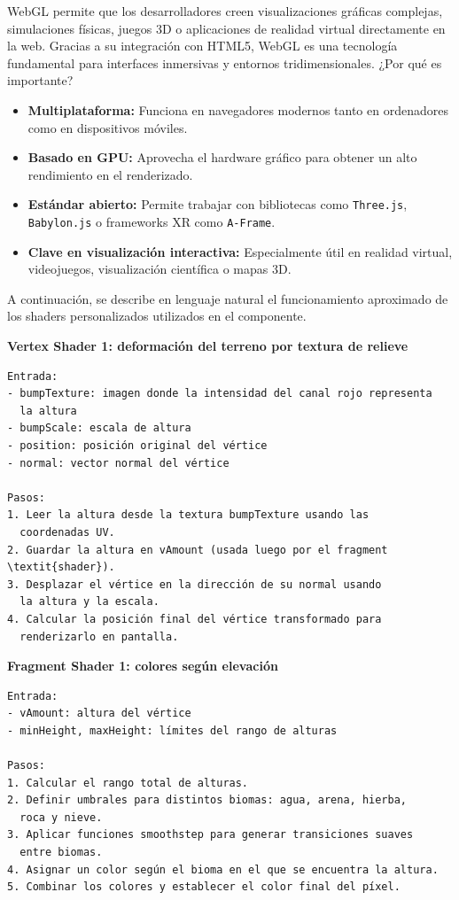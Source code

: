 \documentclass[a4paper, 12pt]{book}
\begin{document}
WebGL permite que los desarrolladores creen visualizaciones gráficas complejas, simulaciones físicas, juegos 3D o aplicaciones de realidad virtual directamente en la web. Gracias a su integración con HTML5, WebGL es una tecnología fundamental para interfaces inmersivas y entornos tridimensionales. ¿Por qué es importante?

\begin{itemize}
    \item \textbf{Multiplataforma:} Funciona en navegadores modernos tanto en ordenadores como en dispositivos móviles.
    \item \textbf{Basado en GPU:} Aprovecha el hardware gráfico para obtener un alto rendimiento en el renderizado.
    \item \textbf{Estándar abierto:} Permite trabajar con bibliotecas como \texttt{Three.js}, \texttt{Babylon.js} o frameworks XR como \texttt{A-Frame}.
    \item \textbf{Clave en visualización interactiva:} Especialmente útil en realidad virtual, videojuegos, visualización científica o mapas 3D.
\end{itemize}

\vspace{0.5cm}

A continuación, se describe en lenguaje natural el funcionamiento aproximado de los shaders personalizados utilizados en el componente.

\textbf{Vertex Shader 1: deformación del terreno por textura de relieve}

\begin{verbatim}
Entrada:
- bumpTexture: imagen donde la intensidad del canal rojo representa 
  la altura
- bumpScale: escala de altura
- position: posición original del vértice
- normal: vector normal del vértice

Pasos:
1. Leer la altura desde la textura bumpTexture usando las 
  coordenadas UV.
2. Guardar la altura en vAmount (usada luego por el fragment \textit{shader}).
3. Desplazar el vértice en la dirección de su normal usando 
  la altura y la escala.
4. Calcular la posición final del vértice transformado para 
  renderizarlo en pantalla.
\end{verbatim}

\textbf{Fragment Shader 1: colores según elevación}

\begin{verbatim}
Entrada:
- vAmount: altura del vértice
- minHeight, maxHeight: límites del rango de alturas

Pasos:
1. Calcular el rango total de alturas.
2. Definir umbrales para distintos biomas: agua, arena, hierba, 
  roca y nieve.
3. Aplicar funciones smoothstep para generar transiciones suaves 
  entre biomas.
4. Asignar un color según el bioma en el que se encuentra la altura.
5. Combinar los colores y establecer el color final del píxel.
\end{verbatim}
\end{document}
